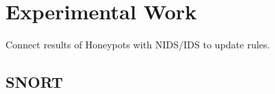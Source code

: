 \chapter{Experimental Work}

Connect results of Honeypots with NIDS/IDS to update rules.

\section{SNORT}